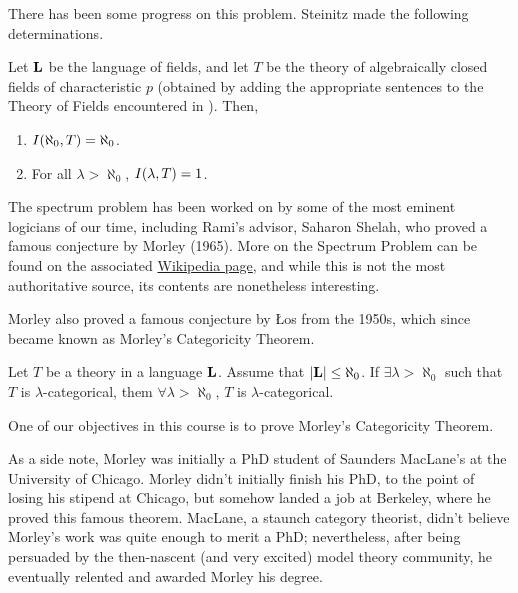 There has been some progress on this problem. Steinitz made the following determinations.

\begin{boxtheorem}[Steinitz]
    Let $\mathbf{L}$ be the language of fields, and let $T$ be the theory of algebraically closed fields of characteristic $p$ (obtained by adding the appropriate sentences to the Theory of Fields encountered in ). Then,
    \begin{enumerate}[label = \normalfont \arabic*.]
        \item $I\!\left( \aleph_{0}, T \right) = \aleph_{0}$.
        \item For all $\lambda > \aleph_{0}$, $I\!\left( \lambda, T \right) = 1$.
    \end{enumerate}
\end{boxtheorem}

The spectrum problem has been worked on by some of the most eminent logicians of our time, including Rami's advisor, Saharon Shelah, who proved a famous conjecture by Morley (1965). More on the Spectrum Problem can be found on the associated \href{https://en.wikipedia.org/wiki/Spectrum_of_a_theory#:~:text=More%20precisely%2C%20for%20any%20complete,of%20a%20countable%20theory%20T.}{Wikipedia page}, and while this is not the most authoritative source, its contents are nonetheless interesting.

Morley also proved a famous conjecture by Łos from the 1950s, which since became known as Morley's Categoricity Theorem.

\begin{boxtheorem}
    Let $T$ be a theory in a language $\mathbf{L}$. Assume that $\left\lvert \mathbf{L} \right\rvert \leq \aleph_{0}$. If $\exists \lambda > \aleph_{0}$ such that $T$ is $\lambda$-categorical, them $\forall \lambda > \aleph_{0}$, $T$ is $\lambda$-categorical.
\end{boxtheorem}

One of our objectives in this course is to prove Morley's Categoricity Theorem.

As a side note, Morley was initially a PhD student of Saunders MacLane's at the University of Chicago. Morley didn't initially finish his PhD, to the point of losing his stipend at Chicago, but somehow landed a job at Berkeley, where he proved this famous theorem. MacLane, a staunch category theorist, didn't believe Morley's work was quite enough to merit a PhD; nevertheless, after being persuaded by the then-nascent (and very excited) model theory community, he eventually relented and awarded Morley his degree.


